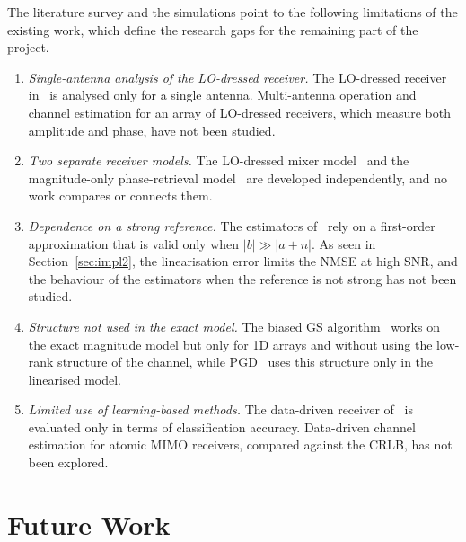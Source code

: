 \documentclass[11pt,a4paper]{article}
\begin{document}
The literature survey and the simulations point to the following limitations of the existing
work, which define the research gaps for the remaining part of the project.
\begin{enumerate}[leftmargin=*,itemsep=2pt]
  \item \textit{Single-antenna analysis of the LO-dressed receiver.} The LO-dressed receiver
        in~\cite{chen2025harnessing} is analysed only for a single antenna. Multi-antenna
        operation and channel estimation for an array of LO-dressed receivers, which measure
        both amplitude and phase, have not been studied.
  \item \textit{Two separate receiver models.} The LO-dressed mixer
        model~\cite{chen2025harnessing} and the magnitude-only phase-retrieval
        model~\cite{cui2025towards,xu2025channel} are developed independently, and no work
        compares or connects them.
  \item \textit{Dependence on a strong reference.} The estimators of~\cite{xu2025channel} rely on
        a first-order approximation that is valid only when $|b|\gg|a+n|$. As seen in
        Section~\ref{sec:impl2}, the linearisation error limits the NMSE at high SNR, and the
        behaviour of the estimators when the reference is not strong has not been studied.
  \item \textit{Structure not used in the exact model.} The biased GS
        algorithm~\cite{cui2025towards} works on the exact magnitude model but only for 1D arrays
        and without using the low-rank structure of the channel, while PGD~\cite{xu2025channel}
        uses this structure only in the linearised model.
  \item \textit{Limited use of learning-based methods.} The data-driven receiver
        of~\cite{liu2022deep} is evaluated only in terms of classification accuracy. Data-driven
        channel estimation for atomic MIMO receivers, compared against the CRLB, has not been
        explored.
\end{enumerate}


\section{Future Work}
\label{sec:future}
\end{document}
